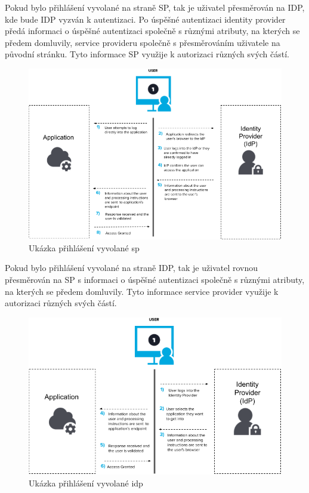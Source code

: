 Pokud bylo přihlášení vyvolané na straně SP, tak je uživatel přesměrován na IDP, kde bude IDP vyzván k autentizaci.
Po úspěšné autentizaci identity provider předá informaci o úspěšné autentizaci společně s různými atributy, na kterých se předem domluvily, service provideru společně s přesměrováním uživatele na původní stránku.
Tyto informace SP využije k autorizaci různých svých částí.\cite{SAMLxOIDC}
\begin{figure}[bp]
	\centering
    \includegraphics[width=1\textwidth]{obrazky-figures/saml-sp-cropped.png}
	\caption{Ukázka přihlášení vyvolané sp\cite{SAMLxOIDC}}
	\label{saml-flow}
\end{figure}

Pokud bylo přihlášení vyvolané na straně IDP, tak je uživatel rovnou přesměrován na SP s informaci o úspěšné autentizaci společně s různými atributy, na kterých se předem domluvily.
Tyto informace service provider využije k autorizaci různých svých částí.\cite{SAMLxOIDC}

\begin{figure}[bp]
	\centering
    \includegraphics[width=1\textwidth]{obrazky-figures/saml-idp-cropped.png}
	\caption{Ukázka přihlášení vyvolané idp\cite{SAMLxOIDC}}
	\label{saml-flow}
\end{figure}
